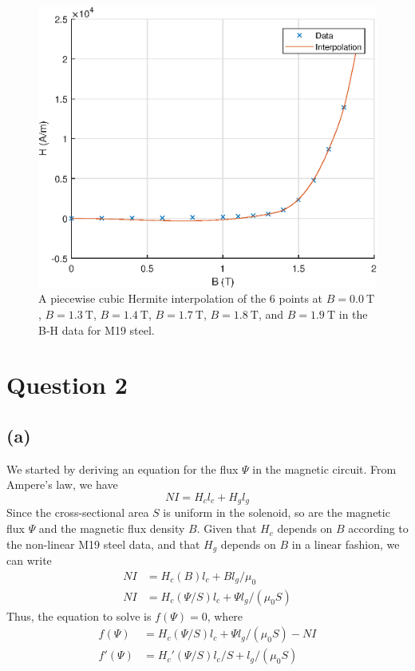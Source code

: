 \documentclass[journal,hidelinks]{IEEEtran}
\begin{document}
\begin{figure}[!htb]
  \centering
  \includegraphics[width=\columnwidth]{question-1/q1c.eps}
  \caption{A piecewise cubic Hermite interpolation of the $6$ points at $B = \SI{0.0}{\tesla}$, $B = \SI{1.3}{\tesla}$, $B = \SI{1.4}{\tesla}$, $B = \SI{1.7}{\tesla}$, $B = \SI{1.8}{\tesla}$, and $B = \SI{1.9}{\tesla}$ in the B-H data for M19 steel.}
  \label{fig:q1c}
\end{figure}

\section*{Question 2}

\subsection*{(a)}

We started by deriving an equation for the flux $\Psi$ in the magnetic circuit. From Ampere's law, we have
\begin{equation}
N I = H_c l_c + H_g l_g
\end{equation}
Since the cross-sectional area $S$ is uniform in the solenoid, so are the magnetic flux $\Psi$ and the magnetic flux density $B$. Given that $H_c$ depends on $B$ according to the non-linear M19 steel data, and that $H_g$ depends on $B$ in a linear fashion, we can write
\begin{align}
N I &= H_c(B) l_c + B l_g / \mu_0 \\
N I &= H_c(\Psi / S) l_c + \Psi l_g / (\mu_0 S)
\end{align}
Thus, the equation to solve is $f(\Psi) = 0$, where
\begin{align}
f(\Psi) &= H_c(\Psi / S) l_c + \Psi l_g / (\mu_0 S) - N I \\
f'(\Psi) &= H_c'(\Psi / S) l_c / S + l_g / (\mu_0 S)
\end{align}
\end{document}
